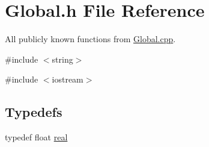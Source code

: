 \section{Global.h File Reference}
\label{Global_8h}


All publicly known functions from \hyperlink{Global_8cpp}{Global.cpp}.  


{\ttfamily \#include $<$string$>$}\par
{\ttfamily \#include $<$iostream$>$}\par
\subsection*{Typedefs}
\begin{DoxyCompactItemize}
\item 
typedef float \hyperlink{Global_8h_a031f8951175b43076c2084a6c2173410}{real}
\end{DoxyCompactItemize}

